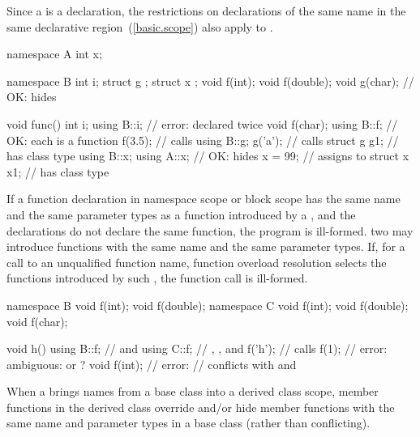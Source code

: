\pnum
Since a  is a declaration, the restrictions
on declarations of the same name in the same declarative
region~(\ref{basic.scope}) also apply to .
\enterexample

\begin{codeblock}
namespace A {
	int x;
}

namespace B {
	int i;
	struct g { };
	struct x { };
	void f(int);
	void f(double);
	void g(char);		// OK: hides 
}

void func()
{
	int i;
	using B::i;		// error:  declared twice
	void f(char);
	using B::f;		// OK: each  is a function
	f(3.5);			// calls 
	using B::g;
	g('a');			// calls 
	struct g g1;		//  has class type 
	using B::x;
	using A::x;		// OK: hides 
	x = 99;			// assigns to 
	struct x x1;		//  has class type 
}
\end{codeblock}
\exitexampleb

\pnum
If a function declaration in namespace scope or block scope has the same
name and the same parameter types as a function introduced by a
, and the declarations do not declare the
same function, the program is ill-formed.
\enternote
two  may introduce functions with the same
name and the same parameter types. If, for a call to an unqualified
function name, function overload resolution selects the functions
introduced by such , the function call is
ill-formed.\\
\enterexample

\begin{codeblock}
namespace B {
	void f(int);
	void f(double);
}
namespace C {
	void f(int);
	void f(double);
	void f(char);
}

void h()
{
	using B::f;		//  and 
	using C::f;		// , , and 
	f('h');			// calls 
	f(1);			// error: ambiguous:  or ?
	void f(int);		// error:
				//  conflicts with  and 
}
\end{codeblock}
\exitexampleb
\exitnote

\pnum
{}%
When a  brings names from a base class into
a derived class scope, member functions in the derived class override
and/or hide member functions with the same name and parameter types in a base
class (rather than conflicting).
\enterexample

